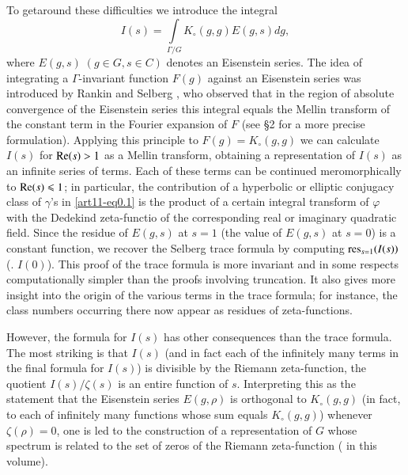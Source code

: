 To get\pageoriginale around these difficulties we introduce the integral
\begin{equation*}
I(s) = \int\limits_{\Gamma / G} K_\circ (g,g) E (g,s) dg, \tag{0.3}\label{art11-eq0.3}
\end{equation*}
where $E(g,s) \; (g \in G, s \in C )$ denotes an Eisenstein series. The idea of integrating a $\Gamma$-invariant function $F(g)$ against an Eisenstein series was introduced by Rankin \cite{art11-5} and Selberg \cite{art11-6}, who observed that in the region of absolute convergence of the Eisenstein series this  integral equals the Mellin transform of the constant term in the Fourier expansion of $F$ (see \S 2 for a more precise formulation). Applying this principle to $F(g)= K_\circ (g,g)$ we can calculate $I(s)$ for $\operatorname{Re} (s) >1$ as a Mellin transform, obtaining a representation of $I(s)$ as an infinite series of terms. Each of these terms can be continued meromorphically to $\operatorname{Re} (s) \leqslant 1$; in particular, the contribution of a hyperbolic or elliptic conjugacy class of $\gamma$'s in \eqref{art11-eq0.1} is the product of a certain integral transform of $\varphi$ with the Dedekind zeta-functio
 of the corresponding real or imaginary quadratic field. Since the residue of $E(g,s)$ at $s =1$ (\resp the value of $E(g,s)$ at $s=0$) is a constant function, we recover the Selberg trace formula by computing $\mathrm{res}_{s=1} (I(s))$ (\resp. $I(0)$). This proof of the trace formula is more invariant and in some respects computationally simpler than the proofs involving truncation. It also gives more insight into the origin of the various terms in the trace formula; for instance, the class numbers occurring there now appear as residues of zeta-functions. 

However, the formula for $I(s)$ has other consequences than the trace formula. The most striking is that $I(s)$ (and in fact each of the infinitely many terms in the final formula for $I(s)$) is divisible by the Riemann zeta-function, \ie the quotient $I(s)/\zeta(s)$ is an entire function of $s$. Interpreting this as the statement that the Eisenstein series $E(g, \rho)$ is orthogonal to $K_\circ (g, g)$ (in fact, to each of infinitely many functions whose sum equals $K_\circ (g, g)$) whenever $\zeta(\rho) =0$, one is led to the construction of a representation of $G$ whose spectrum is related to the set of zeros of the Riemann zeta-function (\cf \cite{art11-11} in this volume).

